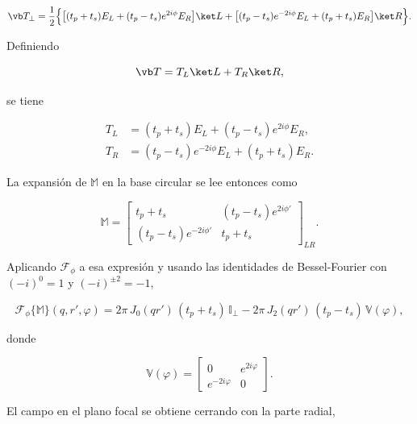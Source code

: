\begin{equation}
\vb T_\perp
=
\frac{1}{2}
\Big\{
\big[(t_p+t_s)E_L+(t_p-t_s)e^{2i\phi}E_R\big]\ket L
+
\big[(t_p-t_s)e^{-2i\phi}E_L+(t_p+t_s)E_R\big]\ket R
\Big\}.
\label{eq:T_perp_circular_basis}
\end{equation}

Definiendo

\begin{equation}
  \vb T
  =
  T_L\ket L
  +
  T_R\ket R,
\end{equation}

se tiene

\begin{equation}
\begin{aligned}
T_L
&=
(t_p+t_s)E_L
+
(t_p-t_s)e^{2i\phi}E_R,
\\
T_R
&=
(t_p-t_s)e^{-2i\phi}E_L
+
(t_p+t_s)E_R.
\end{aligned}
\label{eq:TL_TR_circular}
\end{equation}

La expansión de $\mathbb{M}$ en la base circular se lee entonces como

\begin{equation}
\mathbb M
=
\begin{bmatrix}
t_p+t_s
&
(t_p-t_s)e^{2i\phi'}
\\
(t_p-t_s)e^{-2i\phi'}
&
t_p+t_s
\end{bmatrix}_{LR}.
\label{eq:M_in_circular_basis}
\end{equation}

Aplicando $\mathscr{F}_\phi$ a esa expresión y usando las identidades de Bessel-Fourier con $(-i)^0 = 1$ y $(-i)^{\pm 2} = -1$,

\begin{equation}
  \mathscr{F}_\phi\{\mathbb{M}\}(q, r', \varphi)
  =
  2\pi\,J_0(qr')\,(t_p+t_s)\,\mathbb{I}_\perp
  -
  2\pi\,J_2(qr')\,(t_p-t_s)\,\mathbb{V}(\varphi),
  \label{eq:Fphi_M_circular}
\end{equation}

donde

\begin{equation}
\mathbb V(\varphi)
=
\begin{bmatrix}
0 & e^{2i\varphi}
\\
e^{-2i\varphi} & 0
\end{bmatrix}.
\label{eq:def_V_mixing}
\end{equation}

El campo en el plano focal se obtiene cerrando con la parte radial,

